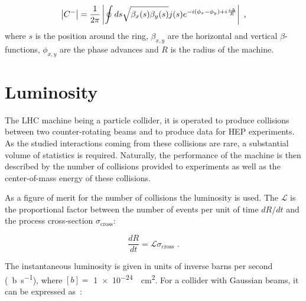 \begin{equation}
    \left\lvert C^{-} \right\rvert = \frac{1}{2 \pi} \left\lvert  \oint ds \sqrt{\beta_x(s) \beta_y(s)} j(s) e^{-i \left( \phi_x - \phi_y \right) + i \frac{s \Delta}{R}}  \right\rvert \text{ ,}
    \label{equation:deltaqmin_guignard}
\end{equation}
where \(s\) is the position around the ring, \(\beta_{x,y}\) are the horizontal and vertical \(\beta\)-functions, \(\phi_{x,y}\) are the phase advances and \(R\) is the radius of the machine.


\section{Luminosity}
\label{section:luminosity}


The \gls{LHC} machine being a particle collider, it is operated to produce collisions between two counter-rotating beams and to produce data for \gls{HEP} \glspl{experiment}.
As the studied interactions coming from these collisions are rare, a substantial volume of statistics is required. 
Naturally, the performance of the machine is then described by the number of collisions provided to experiments as well as the center-of-mass energy of these collisions.

As a figure of merit for the number of collisions the \gls{luminosity} is used.
The  \(\mathcal{L}\) is the proportional factor between the number of events per unit of time \(dR / dt\) and the process cross-section \(\sigma_{\mathrm{cross}}\):

\begin{equation}
    \dfrac{dR}{dt} = \mathcal{L} \sigma_{\mathrm{cross}} \text{ .}
    \label{equation:instantaneous_luminosity_definition}
\end{equation}

The instantaneous luminosity is given in units of inverse barns per second (\unit{\per\barn\per\second}), where \(\left[ b \right] = \) \qty{1e-24}{\per\square\centi\meter}.
For a collider with Gaussian beams, it can be expressed as~\cite{CERN:Herr:Concept_Luminosity}:

